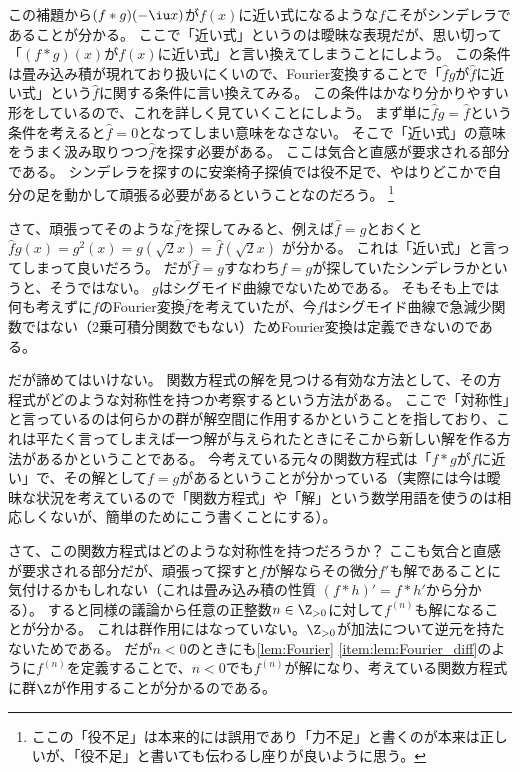 \documentclass[11pt,b5paper,oneside,lualatex]{ltjsarticle} %
\numberwithin{equation}{section} %
\begin{document}
この補題から$ (f \ast g)(-\iu x) $が$ f(x) $に近い式になるような$ f $こそがシンデレラであることが分かる。
ここで「近い式」というのは曖昧な表現だが、思い切って「$ (f \ast g)(x) $が$ f(x) $に近い式」と言い換えてしまうことにしよう。
この条件は畳み込み積が現れており扱いにくいので、Fourier変換することで「$ \widehat{f} g $が$ \widehat{f} $に近い式」という$ \widehat{f} $に関する条件に言い換えてみる。
この条件はかなり分かりやすい形をしているので、これを詳しく見ていくことにしよう。
まず単に$ \widehat{f} g = \widehat{f} $という条件を考えると$ \widehat{f} = 0 $となってしまい意味をなさない。
そこで「近い式」の意味をうまく汲み取りつつ$ \widehat{f} $を探す必要がある。
ここは気合と直感が要求される部分である。
シンデレラを探すのに安楽椅子探偵では役不足で、やはりどこかで自分の足を動かして頑張る必要があるということなのだろう。
\footnote{ここの「役不足」は本来的には誤用であり「力不足」と書くのが本来は正しいが、「役不足」と書いても伝わるし座りが良いように思う。}

さて、頑張ってそのような$ \widehat{f} $を探してみると、例えば$ \widehat{f} = g $とおくと
$ \widehat{f} g (x) = g^2 (x) = g(\sqrt{2} x) = \widehat{f} (\sqrt{2} x) $
が分かる。
これは「近い式」と言ってしまって良いだろう。
だが$ \widehat{f} = g $すなわち$ f = g $が探していたシンデレラかというと、そうではない。
$ g $はシグモイド曲線でないためである。
そもそも上では何も考えずに$ f $のFourier変換$ \widehat{f} $を考えていたが、今$ f $はシグモイド曲線で急減少関数ではない（$ 2 $乗可積分関数でもない）ためFourier変換は定義できないのである。

だが諦めてはいけない。
関数方程式の解を見つける有効な方法として、その方程式がどのような対称性を持つか考察するという方法がある。
ここで「対称性」と言っているのは何らかの群が解空間に作用するかということを指しており、これは平たく言ってしまえば一つ解が与えられたときにそこから新しい解を作る方法があるかということである。
今考えている元々の関数方程式は「$ f \ast g $が$ f $に近い」で、その解として$ f = g $があるということが分かっている（実際には今は曖昧な状況を考えているので「関数方程式」や「解」という数学用語を使うのは相応しくないが、簡単のためにこう書くことにする）。

さて、この関数方程式はどのような対称性を持つだろうか？
ここも気合と直感が要求される部分だが、頑張って探すと$ f $が解ならその微分$ f' $も解であることに気付けるかもしれない（これは畳み込み積の性質
$ (f \ast h)' = f \ast h' $から分かる）。
すると同様の議論から任意の正整数$ n \in \Z_{>0} $に対して$ f^{(n)} $も解になることが分かる。
これは群作用にはなっていない。$ \Z_{>0} $が加法について逆元を持たないためである。
だが$ n < 0 $のときにも\cref{lem:Fourier} \cref{item:lem:Fourier_diff}のように$ f^{(n)} $を定義することで、$ n < 0 $でも$ f^{(n)} $が解になり、考えている関数方程式に群$ \Z $が作用することが分かるのである。
\end{document}
